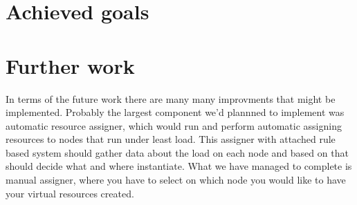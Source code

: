 \documentclass[11pt]{book}
\begin{document}
    \section{Achieved goals}
	
		

    \section{Further work}
	
	In terms of the future work there are many many improvments that might be implemented. Probably the largest component we'd plannned to implement was automatic resource assigner, which would run
        and perform automatic assigning resources to nodes that run under least load. This assigner with attached rule based system should gather data about the load on each node and based on that should 
        decide what and where instantiate. What we have managed to complete is manual assigner, where you have to select on which node you would like to have your virtual resources created.


  
  
	

\end{document}
